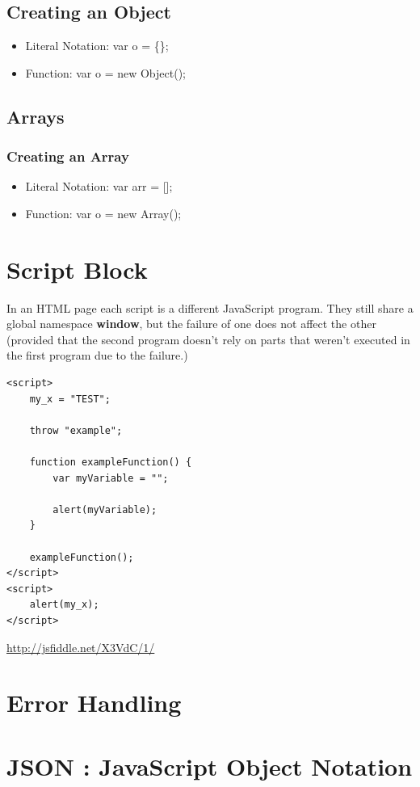 \documentclass {amsart}
\begin{document}
	\subsection{Creating an Object}
		\begin{itemize}
			\item Literal Notation: var o = \{\};
			\item Function: var o = new Object();
		\end{itemize}		

	\subsection{Arrays}
		\subsubsection {Creating an Array}
			\begin{itemize}
				\item Literal Notation: var arr = [];
				\item Function: var o = new Array();
			\end{itemize}
	
	
\section{Script Block}
	In an HTML page each script is a different JavaScript program.  They still share a global namespace {\bf window}, but the failure of one does not affect the other (provided that the second program doesn't rely on parts that weren't executed in the first program due to the failure.)

\begin{lstlisting}
<script>
    my_x = "TEST";

    throw "example";

    function exampleFunction() {
        var myVariable = "";

        alert(myVariable);
    }

    exampleFunction();
</script>
<script>
    alert(my_x);
</script>
\end{lstlisting}
\url{http://jsfiddle.net/X3VdC/1/}

\section{Error Handling}


\section{JSON : JavaScript Object Notation}
\end{document}
